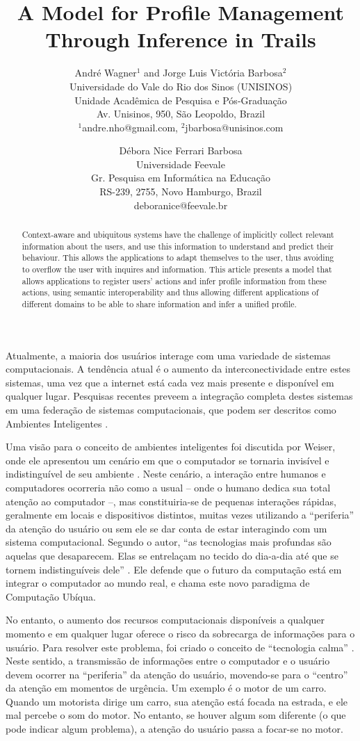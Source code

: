 \documentclass[times, 10pt, twocolumn]{article}
\title{A Model for Profile Management Through Inference in Trails}
\author{André Wagner$^1$ and Jorge Luis Victória Barbosa$^2$\\
Universidade do Vale do Rio dos Sinos (UNISINOS)\\
Unidade Acadêmica de Pesquisa e Pós-Graduação\\
Av. Unisinos, 950, São Leopoldo, Brazil\\
$^1$andre.nho@gmail.com, $^2$jbarbosa@unisinos.com\\
\and
Débora Nice Ferrari Barbosa\\
Universidade Feevale\\
Gr. Pesquisa em Informática na Educação\\
RS-239, 2755, Novo Hamburgo, Brazil\\
deboranice@feevale.br
}
\begin{document}
\maketitle
\thispagestyle{empty}

\begin{abstract}
Context-aware and ubiquitous systems have the challenge of implicitly collect relevant information about the users, and use this information to understand and predict their behaviour. This allows the applications to adapt themselves to the user, thus avoiding to overflow the user with inquires and information. This article presents a model that allows applications to register users' actions and infer profile information from these actions, using semantic interoperability and thus allowing different applications of different domains to be able to share information and infer a unified profile.
\end{abstract}

\label{ch:introducao}

Atualmente, a maioria dos usuários interage com uma variedade de sistemas computacionais. A tendência atual é o aumento da interconectividade entre estes sistemas, uma vez que a internet está cada vez mais presente e disponível em qualquer lugar. Pesquisas recentes preveem a integração completa destes sistemas em uma federação de sistemas computacionais, que podem ser descritos como Ambientes Inteligentes \cite{heckmann05}.

Uma visão para o conceito de ambientes inteligentes foi discutida por Weiser, onde ele apresentou um cenário em que o computador se tornaria invisível e indistinguível de seu ambiente \cite{weiser91}. Neste cenário, a interação entre humanos e computadores ocorreria não como a usual -- onde o humano dedica sua total atenção ao computador --, mas constituiria-se de pequenas interações rápidas, geralmente em locais e dispositivos distintos, muitas vezes utilizando a ``periferia'' da atenção do usuário \cite{weiser96} ou sem ele se dar conta de estar interagindo com um sistema computacional. Segundo o autor, ``as tecnologias mais profundas são aquelas que desaparecem. Elas se entrelaçam no tecido do dia-a-dia até que se tornem indistinguíveis dele'' \cite{weiser91}. Ele defende que o futuro da computação está em integrar o computador ao mundo real, e chama este novo paradigma de Computação Ubíqua.

No entanto, o aumento dos recursos computacionais disponíveis a qualquer momento e em qualquer lugar oferece o risco da sobrecarga de informações para o usuário. Para resolver este problema, foi criado o conceito de ``tecnologia calma'' \cite{weiser96}. Neste sentido, a transmissão de informações entre o computador e o usuário devem ocorrer na ``periferia'' da atenção do usuário, movendo-se para o ``centro'' da atenção em momentos de urgência. Um exemplo é o motor de um carro. Quando um motorista dirige um carro, sua atenção está focada na estrada, e ele mal percebe o som do motor. No entanto, se houver algum som diferente (o que pode indicar algum problema), a atenção do usuário passa a focar-se no motor.
\end{document}
